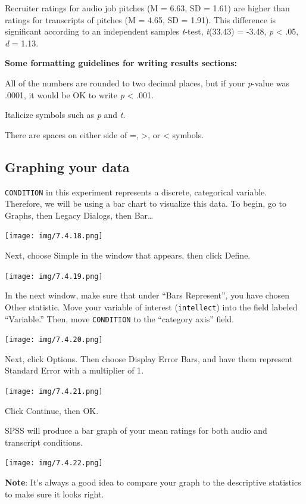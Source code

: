 \documentclass[
]{book}
\begin{document}
Recruiter ratings for audio job pitches (M = 6.63, SD = 1.61) are higher than ratings for transcripts of pitches (M = 4.65, SD = 1.91). This difference is significant according to an independent samples \emph{t}-test, \emph{t}(33.43) = -3.48, \emph{p} \textless{} .05, \emph{d} = 1.13.

\textbf{Some formatting guidelines for writing results sections: }

All of the numbers are rounded to two decimal places, but if your \emph{p}-value was .0001, it would be OK to write \emph{p} \textless{} .001.

Italicize symbols such as \emph{p} and \emph{t}.

There are spaces on either side of =, \textgreater, or \textless{} symbols.

\hypertarget{graphing-your-data}{%
\subsection{Graphing your data}\label{graphing-your-data}}

\texttt{CONDITION} in this experiment represents a discrete, categorical variable. Therefore, we will be using a bar chart to visualize this data. To begin, go to {Graphs}, then {Legacy Dialogs}, then {Bar\ldots{}}

\texttt{[image: img/7.4.18.png]}

Next, choose {Simple} in the window that appears, then click {Define}.

\texttt{[image: img/7.4.19.png]}

In the next window, make sure that under ``Bars Represent'', you have chosen {Other statistic}. Move your variable of interest (\texttt{intellect}) into the field labeled ``Variable.'' Then, move \texttt{CONDITION} to the ``category axis'' field.

\texttt{[image: img/7.4.20.png]}

Next, click {Options}. Then choose {Display Error Bars}, and have them represent {Standard Error} with a {multiplier of 1}.

\texttt{[image: img/7.4.21.png]}

Click {Continue}, then {OK}.

SPSS will produce a bar graph of your mean ratings for both audio and transcript conditions.

\texttt{[image: img/7.4.22.png]}

\textbf{Note}: It's always a good idea to compare your graph to the descriptive statistics to make sure it looks right.
\end{document}

